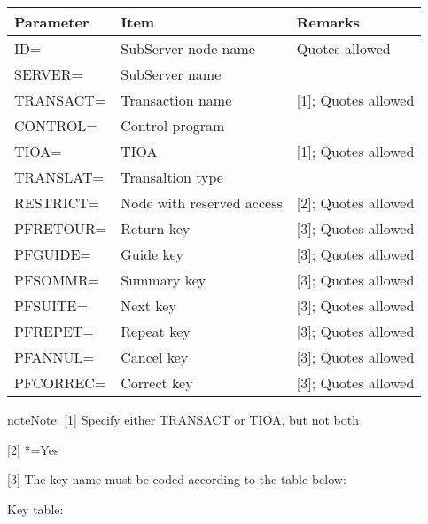 \documentclass[letterpaper,10pt,english]{sphinxmanual}
\begin{document}
\begin{savenotes}\sphinxattablestart
\centering
\begin{tabulary}{\linewidth}[t]{|T|T|T|}
\hline
\sphinxstyletheadfamily 
Parameter
&\sphinxstyletheadfamily 
Item
&\sphinxstyletheadfamily 
Remarks
\\
\hline
ID=
&
SubServer node name
&
Quotes allowed
\\
\hline
SERVER=
&
SubServer name
&\\
\hline
TRANSACT=
&
Transaction name
&
{[}1{]}; Quotes allowed
\\
\hline
CONTROL=
&
Control program
&\\
\hline
TIOA=
&
TIOA
&
{[}1{]}; Quotes allowed
\\
\hline
TRANSLAT=
&
Transaltion type
&\\
\hline
RESTRICT=
&
Node with reserved
access
&
{[}2{]}; Quotes allowed
\\
\hline
PFRETOUR=
&
Return key
&
{[}3{]}; Quotes allowed
\\
\hline
PFGUIDE=
&
Guide key
&
{[}3{]}; Quotes allowed
\\
\hline
PFSOMMR=
&
Summary key
&
{[}3{]}; Quotes allowed
\\
\hline
PFSUITE=
&
Next key
&
{[}3{]}; Quotes allowed
\\
\hline
PFREPET=
&
Repeat key
&
{[}3{]}; Quotes allowed
\\
\hline
PFANNUL=
&
Cancel key
&
{[}3{]}; Quotes allowed
\\
\hline
PFCORREC=
&
Correct key
&
{[}3{]}; Quotes allowed
\\
\hline
\end{tabulary}
\par
\sphinxattableend\end{savenotes}

\begin{sphinxadmonition}{note}{Note:}
{[}1{]}  Specify either TRANSACT or TIOA, but not both

{[}2{]}  *=Yes

{[}3{]}  The key name must be coded according to the table below:
\end{sphinxadmonition}

Key table:
\end{document}
